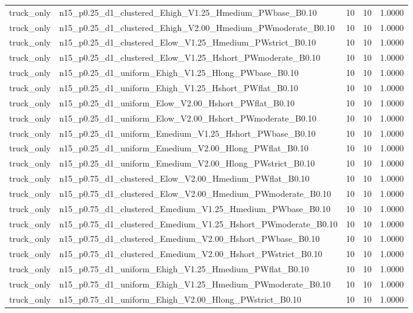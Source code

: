 \begin{tabular}{llrrr}
truck_only & n15_p0.25_d1_clustered_Ehigh_V1.25_Hmedium_PWbase_B0.10 & 10 & 10 & 1.0000 \\
truck_only & n15_p0.25_d1_clustered_Ehigh_V2.00_Hmedium_PWmoderate_B0.10 & 10 & 10 & 1.0000 \\
truck_only & n15_p0.25_d1_clustered_Elow_V1.25_Hmedium_PWstrict_B0.10 & 10 & 10 & 1.0000 \\
truck_only & n15_p0.25_d1_clustered_Elow_V1.25_Hshort_PWmoderate_B0.10 & 10 & 10 & 1.0000 \\
truck_only & n15_p0.25_d1_uniform_Ehigh_V1.25_Hlong_PWbase_B0.10 & 10 & 10 & 1.0000 \\
truck_only & n15_p0.25_d1_uniform_Ehigh_V1.25_Hshort_PWflat_B0.10 & 10 & 10 & 1.0000 \\
truck_only & n15_p0.25_d1_uniform_Elow_V2.00_Hshort_PWflat_B0.10 & 10 & 10 & 1.0000 \\
truck_only & n15_p0.25_d1_uniform_Elow_V2.00_Hshort_PWmoderate_B0.10 & 10 & 10 & 1.0000 \\
truck_only & n15_p0.25_d1_uniform_Emedium_V1.25_Hshort_PWbase_B0.10 & 10 & 10 & 1.0000 \\
truck_only & n15_p0.25_d1_uniform_Emedium_V2.00_Hlong_PWflat_B0.10 & 10 & 10 & 1.0000 \\
truck_only & n15_p0.25_d1_uniform_Emedium_V2.00_Hlong_PWstrict_B0.10 & 10 & 10 & 1.0000 \\
truck_only & n15_p0.75_d1_clustered_Elow_V2.00_Hmedium_PWflat_B0.10 & 10 & 10 & 1.0000 \\
truck_only & n15_p0.75_d1_clustered_Elow_V2.00_Hmedium_PWmoderate_B0.10 & 10 & 10 & 1.0000 \\
truck_only & n15_p0.75_d1_clustered_Emedium_V1.25_Hmedium_PWbase_B0.10 & 10 & 10 & 1.0000 \\
truck_only & n15_p0.75_d1_clustered_Emedium_V1.25_Hshort_PWmoderate_B0.10 & 10 & 10 & 1.0000 \\
truck_only & n15_p0.75_d1_clustered_Emedium_V2.00_Hshort_PWbase_B0.10 & 10 & 10 & 1.0000 \\
truck_only & n15_p0.75_d1_clustered_Emedium_V2.00_Hshort_PWstrict_B0.10 & 10 & 10 & 1.0000 \\
truck_only & n15_p0.75_d1_uniform_Ehigh_V1.25_Hmedium_PWflat_B0.10 & 10 & 10 & 1.0000 \\
truck_only & n15_p0.75_d1_uniform_Ehigh_V1.25_Hmedium_PWmoderate_B0.10 & 10 & 10 & 1.0000 \\
truck_only & n15_p0.75_d1_uniform_Ehigh_V2.00_Hlong_PWstrict_B0.10 & 10 & 10 & 1.0000 \\

\end{tabular}
